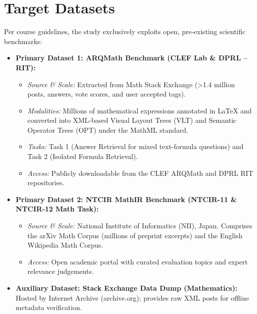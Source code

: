 \documentclass[11pt,a4paper]{article}
\begin{document}
\section{Target Datasets}
Per course guidelines, the study exclusively exploits open, pre-existing scientific benchmarks:
\begin{itemize}
	\item \textbf{Primary Dataset 1: ARQMath Benchmark (CLEF Lab \& DPRL -- RIT):}
	\begin{itemize}
		\item \textit{Source \& Scale:} Extracted from Math Stack Exchange (>1.4 million posts, answers, vote scores, and user accepted tags).
		\item \textit{Modalities:} Millions of mathematical expressions annotated in \LaTeX{} and converted into XML-based Visual Layout Trees (VLT) and Semantic Operator Trees (OPT) under the MathML standard.
		\item \textit{Tasks:} Task 1 (Answer Retrieval for mixed text-formula questions) and Task 2 (Isolated Formula Retrieval).
		\item \textit{Access:} Publicly downloadable from the CLEF ARQMath and DPRL RIT repositories.
	\end{itemize}
	\item \textbf{Primary Dataset 2: NTCIR MathIR Benchmark (NTCIR-11 \& NTCIR-12 Math Task):}
	\begin{itemize}
		\item \textit{Source \& Scale:} National Institute of Informatics (NII), Japan. Comprises the arXiv Math Corpus (millions of preprint excerpts) and the English Wikipedia Math Corpus.
		\item \textit{Access:} Open academic portal with curated evaluation topics and expert relevance judgements.
	\end{itemize}
	\item \textbf{Auxiliary Dataset: Stack Exchange Data Dump (Mathematics):} Hosted by Internet Archive (archive.org); provides raw XML posts for offline metadata verification.
\end{itemize}

\end{document}
